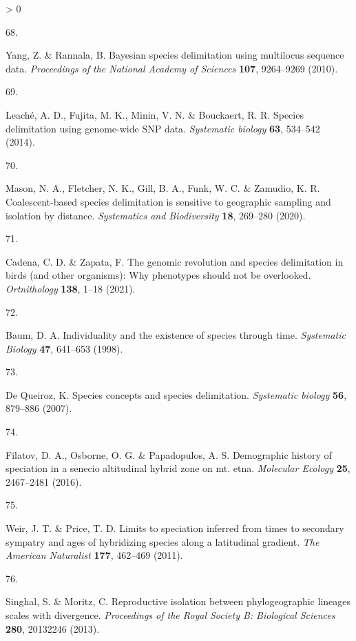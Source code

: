 \documentclass[
  11pt,
]{article}
\newlength{\cslhangindent}
\newlength{\csllabelwidth}
\newenvironment{CSLReferences}[2] %
 {%
  \setlength{\parindent}{0pt}
  \ifodd #1 \everypar{\setlength{\hangindent}{\cslhangindent}}\ignorespaces\fi
  \ifnum #2 > 0
  \setlength{\parskip}{#2\baselineskip}
  \fi
 }%
 {}
\newcommand{\CSLLeftMargin}[1]{\parbox[t]{\csllabelwidth}{#1}}
\newcommand{\CSLRightInline}[1]{\parbox[t]{\linewidth - \csllabelwidth}{#1}\break}
\begin{document}
\begin{CSLReferences}{0}{0}
\leavevmode\hypertarget{ref-yang2010bayesian}{}%
\CSLLeftMargin{68. }
\CSLRightInline{Yang, Z. \& Rannala, B. Bayesian species delimitation using multilocus sequence data. \emph{Proceedings of the National Academy of Sciences} \textbf{107}, 9264--9269 (2010).}

\leavevmode\hypertarget{ref-leache2014species}{}%
\CSLLeftMargin{69. }
\CSLRightInline{Leaché, A. D., Fujita, M. K., Minin, V. N. \& Bouckaert, R. R. Species delimitation using genome-wide SNP data. \emph{Systematic biology} \textbf{63}, 534--542 (2014).}

\leavevmode\hypertarget{ref-mason2020coalescent}{}%
\CSLLeftMargin{70. }
\CSLRightInline{Mason, N. A., Fletcher, N. K., Gill, B. A., Funk, W. C. \& Zamudio, K. R. Coalescent-based species delimitation is sensitive to geographic sampling and isolation by distance. \emph{Systematics and Biodiversity} \textbf{18}, 269--280 (2020).}

\leavevmode\hypertarget{ref-cadena2021genomic}{}%
\CSLLeftMargin{71. }
\CSLRightInline{Cadena, C. D. \& Zapata, F. The genomic revolution and species delimitation in birds (and other organisms): Why phenotypes should not be overlooked. \emph{Ortnithology} \textbf{138}, 1--18 (2021).}

\leavevmode\hypertarget{ref-baum1998individuality}{}%
\CSLLeftMargin{72. }
\CSLRightInline{Baum, D. A. Individuality and the existence of species through time. \emph{Systematic Biology} \textbf{47}, 641--653 (1998).}

\leavevmode\hypertarget{ref-de2007species}{}%
\CSLLeftMargin{73. }
\CSLRightInline{De Queiroz, K. Species concepts and species delimitation. \emph{Systematic biology} \textbf{56}, 879--886 (2007).}

\leavevmode\hypertarget{ref-filatov2016demographic}{}%
\CSLLeftMargin{74. }
\CSLRightInline{Filatov, D. A., Osborne, O. G. \& Papadopulos, A. S. Demographic history of speciation in a senecio altitudinal hybrid zone on mt. etna. \emph{Molecular Ecology} \textbf{25}, 2467--2481 (2016).}

\leavevmode\hypertarget{ref-weir2011limits}{}%
\CSLLeftMargin{75. }
\CSLRightInline{Weir, J. T. \& Price, T. D. Limits to speciation inferred from times to secondary sympatry and ages of hybridizing species along a latitudinal gradient. \emph{The American Naturalist} \textbf{177}, 462--469 (2011).}

\leavevmode\hypertarget{ref-singhal2013reproductive}{}%
\CSLLeftMargin{76. }
\CSLRightInline{Singhal, S. \& Moritz, C. Reproductive isolation between phylogeographic lineages scales with divergence. \emph{Proceedings of the Royal Society B: Biological Sciences} \textbf{280}, 20132246 (2013).}


\end{CSLReferences}
\end{document}
